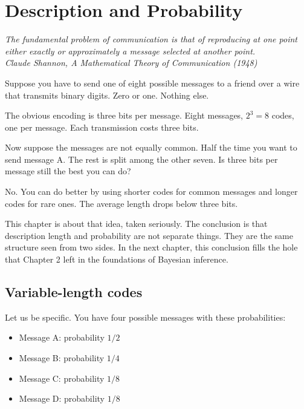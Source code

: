 \chapter{Description and Probability}

\vspace{1em}
\hfill
\begin{minipage}[c]{0.55\textwidth}
\raggedleft
\small\itshape
The fundamental problem of communication is that of reproducing at one point either exactly or approximately a message selected at another point.\\[0.5em]
\upshape\footnotesize Claude Shannon, \textit{A Mathematical Theory of Communication} (1948)
\end{minipage}%
\hspace{0.5em}
\begin{minipage}[c]{0.12\textwidth}
\end{minipage}
\vspace{1.5em}

\noindent Suppose you have to send one of eight possible messages to a friend over a wire that transmits binary digits. Zero or one. Nothing else.

The obvious encoding is three bits per message. Eight messages, $2^3 = 8$ codes, one per message. Each transmission costs three bits.

Now suppose the messages are not equally common. Half the time you want to send message A. The rest is split among the other seven. Is three bits per message still the best you can do?

No. You can do better by using shorter codes for common messages and longer codes for rare ones. The average length drops below three bits.

This chapter is about that idea, taken seriously. The conclusion is that description length and probability are not separate things. They are the same structure seen from two sides. In the next chapter, this conclusion fills the hole that Chapter 2 left in the foundations of Bayesian inference.

\section*{Variable-length codes}

Let us be specific. You have four possible messages with these probabilities:

\begin{itemize}
\item Message A: probability $1/2$
\item Message B: probability $1/4$
\item Message C: probability $1/8$
\item Message D: probability $1/8$
\end{itemize}

